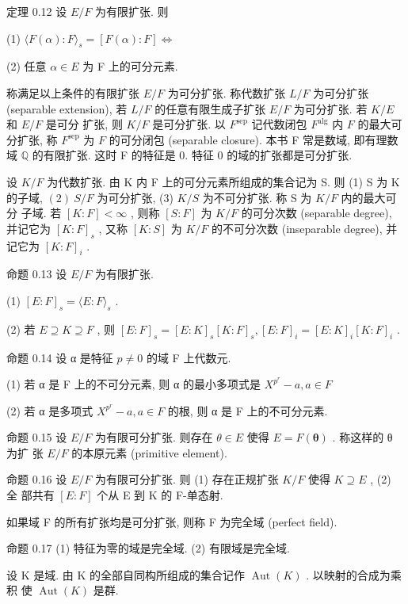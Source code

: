 \documentclass[]{article}
\begin{document}
定理 0.12 设 $E / F$ 为有限扩张. 则 

(1) $\langle F ( \alpha ) : F \rangle _ { s } = [ F ( \alpha ) : F ] \Leftrightarrow$ 

(2) 任意 $\alpha \in E$ 为 F 上的可分元素. 

称满足以上条件的有限扩张 $E / F$ 为可分扩张. 称代数扩张 $L / F$ 为可分扩张 (separable extension), 若 $L / F$ 的任意有限生成子扩张 $E / F$ 为可分扩张. 若 $K / E$ 和 $E / F$ 是可分 扩张, 则 $K / F$ 是可分扩张. 以 $F ^ { \mathrm { s e p } }$ 记代数闭包 $F ^ { \mathrm { a l g } }$ 内 $F$ 的最大可分扩张, 称 $F ^ { \mathrm { s e p } }$ 为 $F$ 的可分闭包 (separable closure). 本书 F 常是数域, 即有理数域 $\mathbb { Q }$ 的有限扩张. 这时 F 的特征是 0. 特征 0 的域的扩张都是可分扩张. 

设 $K / F$ 为代数扩张. 由 K 内 F 上的可分元素所组成的集合记为 S. 则 (1) S 为 K 的子域, $( 2 ) \ S / F$ 为可分扩张, (3) $K / S$ 为不可分扩张. 称 S 为 $K / F$ 内的最大可分 子域. 若 $[ K : F ] < \infty$ , 则称 $\left[ S : F \right]$ 为 $K / F$ 的可分次数 (separable degree), 并记它为 $[ K : F ] _ { s }$ , 又称 $[ K : S ]$ 为 $K / F$ 的不可分次数 (inseparable degree), 并记它为 $[ K : F ] _ { i }$ . 

命题 0.13 设 $E / F$ 为有限扩张. 

(1) $[ E : F ] _ { s } = \langle E : F \rangle _ { s }$ . 

(2) 若 $E \supseteq K \supseteq F$ , 则 $[ E : F ] _ { s } = [ E : K ] _ { s } [ K : F ] _ { s } , [ E : F ] _ { i } = [ E : K ] _ { i } [ K : F ] _ { i }$ . 

命题 0.14 设 α 是特征 $p \neq 0$ 的域 F 上代数元. 

(1) 若 α 是 F 上的不可分元素, 则 α 的最小多项式是 $X ^ { p ^ { r } } - a , a \in F$ 

(2) 若 α 是多项式 $X ^ { p ^ { r } } - a , a \in F$ 的根, 则 α 是 F 上的不可分元素. 

命题 0.15 设 $E / F$ 为有限可分扩张. 则存在 $\theta \in E$ 使得 $E = F ( { \boldsymbol { \theta } } )$ . 称这样的 θ 为扩 张 $E / F$ 的本原元素 (primitive element). 

命题 0.16 设 $E / F$ 为有限可分扩张. 则 (1) 存在正规扩张 $K / F$ 使得 $K \supseteq E$ , (2) 全 部共有 $[ E : F ]$ 个从 E 到 K 的 F-单态射. 

如果域 F 的所有扩张均是可分扩张, 则称 F 为完全域 (perfect field). 

命题 0.17 (1) 特征为零的域是完全域. (2) 有限域是完全域. 

设 K 是域. 由 K 的全部自同构所组成的集合记作 $\operatorname { A u t } ( K )$ . 以映射的合成为乘积 使 $\operatorname { A u t } ( K )$ 是群. 
\end{document}
